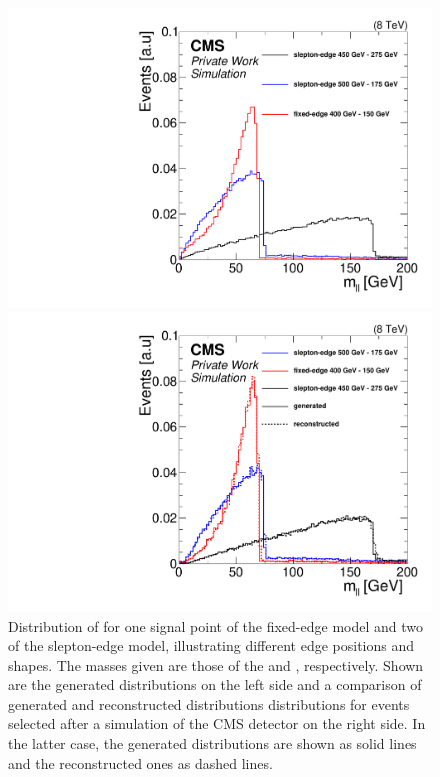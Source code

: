 \begin{figure}
\centering
\begin{minipage}[t]{0.49\textwidth}
\includegraphics[scale=0.3]{plots/THEO/SUSY_masses_Raw.pdf}
\end{minipage}
\begin{minipage}[t]{0.49\textwidth}
\includegraphics[scale=0.3]{plots/THEO/SUSY_masses.pdf}
\end{minipage}
\caption{Distribution of \mll for one signal point of the fixed-edge model and two of the slepton-edge model, illustrating different edge positions and shapes. The masses given are those of the \sbottom and \secondchi, respectively. Shown are the generated distributions on the left side and a comparison of generated and reconstructed distributions distributions for events selected after a simulation of the CMS detector on the right side. In the latter case, the generated distributions are shown as solid lines and the reconstructed ones as dashed lines.}
\label{fig:SUSYMasses}
\end{figure}


